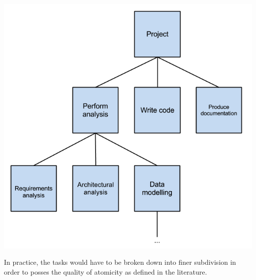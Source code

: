 \begin{center}
\includegraphics[scale=0.5]{TaskBreakdown.png}
\end{center}

In practice, the tasks would have to be broken down into finer subdivision in order to posses the quality of atomicity as defined in the literature.